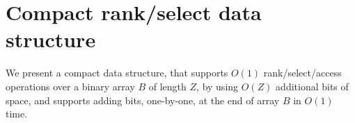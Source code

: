 \documentclass[runningheads]{llncs}
\begin{document}
\section{Compact rank/select data structure}
We present a compact data structure, that supports $O(1)$ rank/select/access operations over a binary array $B$ of length $Z$, by using $O(Z)$ additional bits of space, and supports adding bits, one-by-one, at the end 
of array $B$ in $O(1)$ time.

%
%
%
% 
% 
%



\end{document}
